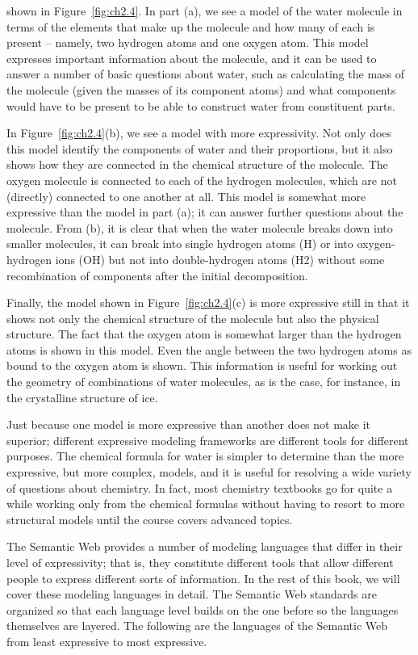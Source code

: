 shown in Figure~\ref{fig:ch2.4}. In part (a), we see a model of the water molecule
in terms of the elements that make up the molecule and how many of each
is present -- namely, two hydrogen atoms and one oxygen atom. This model
expresses important information about the molecule, and it can be used
to answer a number of basic questions about water, such as calculating
the mass of the molecule (given the masses of its component atoms) and
what components would have to be present to be able to construct water
from constituent parts.

In Figure~\ref{fig:ch2.4}(b), we see a model with more expressivity. Not only does
this model identify the components of water and their proportions, but
it also shows how they are connected in the chemical structure of the
molecule. The oxygen molecule is connected to each of the hydrogen
molecules, which are not (directly) connected to one another at all.
This model is somewhat more expressive than the model in part (a); it
can answer further questions about the molecule. From (b), it is clear
that when the water molecule breaks down into smaller molecules, it can
break into single hydrogen atoms (H) or into oxygen-hydrogen ions (OH)
but not into double-hydrogen atoms (H2) without some recombination of
components after the initial decomposition.

Finally, the model shown in Figure~\ref{fig:ch2.4}(c) is more expressive still in
that it shows not only the chemical structure of the molecule but also
the physical structure. The fact that the oxygen atom is somewhat larger
than the hydrogen atoms is shown in this model. Even the angle between
the two hydrogen atoms as bound to the oxygen atom is shown. This
information is useful for working out the geometry of combinations of
water molecules, as is the case, for instance, in the crystalline
structure of ice.

Just because one model is more expressive than another does not make it
superior; different expressive modeling frameworks are different tools
for different purposes. The chemical formula for water is simpler to
determine than the more expressive, but more complex, models, and it is
useful for resolving a wide variety of questions about chemistry. In
fact, most chemistry textbooks go for quite a while working only from
the chemical formulas without having to resort to more structural models
until the course covers advanced topics.

The Semantic Web provides a number of modeling languages that differ in
their level of expressivity; that is, they constitute different tools
that allow different people to express different sorts of information.
In the rest of this book, we will cover these modeling languages in
detail. The Semantic Web standards are organized so that each language
level builds on the one before so the languages themselves are layered.
The following are the languages of the Semantic Web from least
expressive to most expressive.

